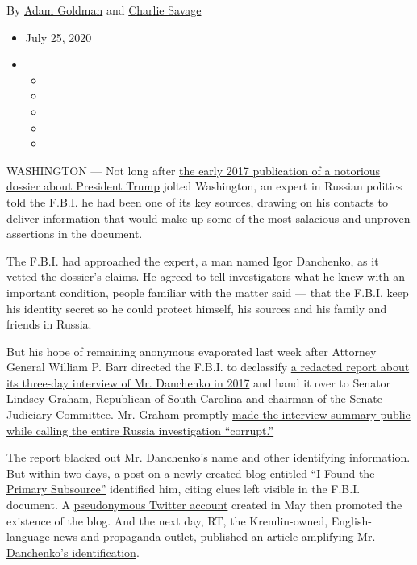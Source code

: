 By \href{https://www.nytimes3xbfgragh.onion/by/adam-goldman}{Adam
Goldman} and
\href{https://www.nytimes3xbfgragh.onion/by/charlie-savage}{Charlie
Savage}

\begin{itemize}
\item
  July 25, 2020
\item
  \begin{itemize}
  \item
  \item
  \item
  \item
  \item
  \end{itemize}
\end{itemize}

WASHINGTON --- Not long after
\href{https://www.nytimes3xbfgragh.onion/2017/01/11/us/politics/donald-trump-russia-intelligence.html}{the
early 2017 publication of a notorious dossier about President Trump}
jolted Washington, an expert in Russian politics told the F.B.I. he had
been one of its key sources, drawing on his contacts to deliver
information that would make up some of the most salacious and unproven
assertions in the document.

The F.B.I. had approached the expert, a man named Igor Danchenko, as it
vetted the dossier's claims. He agreed to tell investigators what he
knew with an important condition, people familiar with the matter said
--- that the F.B.I. keep his identity secret so he could protect
himself, his sources and his family and friends in Russia.

But his hope of remaining anonymous evaporated last week after Attorney
General William P. Barr directed the F.B.I. to declassify
\href{https://www.judiciary.senate.gov/imo/media/doc/February\%209,\%202017\%20Electronic\%20Communication.pdf}{a
redacted report about its three-day interview of Mr. Danchenko in 2017}
and hand it over to Senator Lindsey Graham, Republican of South Carolina
and chairman of the Senate Judiciary Committee. Mr. Graham promptly
\href{https://www.judiciary.senate.gov/press/rep/releases/judiciary-committee-releases-declassified-documents-that-substantially-undercut-steele-dossier-page-fisa-warrants}{made
the interview summary public while calling the entire Russia
investigation ``corrupt.''}

The report blacked out Mr. Danchenko's name and other identifying
information. But within two days, a post on a newly created blog
\href{https://ifoundthepss.blogspot.com/}{entitled ``I Found the Primary
Subsource''} identified him, citing clues left visible in the F.B.I.
document. A \href{https://twitter.com/Hmmm57474203}{pseudonymous Twitter
account} created in May then promoted the existence of the blog. And the
next day, RT, the Kremlin-owned, English-language news and propaganda
outlet,
\href{https://www.rt.com/usa/495342-russiagate-steele-dossier-source/}{published
an article amplifying Mr. Danchenko's identification}.

